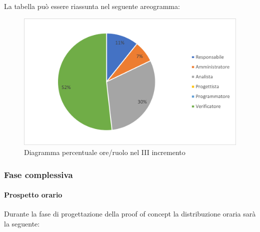 La tabella può essere riassunta nel seguente areogramma:
\begin{figure}[H]
	\centering
	\includegraphics[width=0.8\linewidth]{res/images/preventivo/dettaglio_analisi/3-2.png}
	\caption{Diagramma percentuale ore/ruolo nel III incremento}
	\label{fig:diagramma costi ruolo III incremento}
\end{figure}

\subsubsection{Fase complessiva}
\paragraph{Prospetto orario}
Durante la fase di progettazione della proof of concept la distribuzione oraria sarà la seguente:

